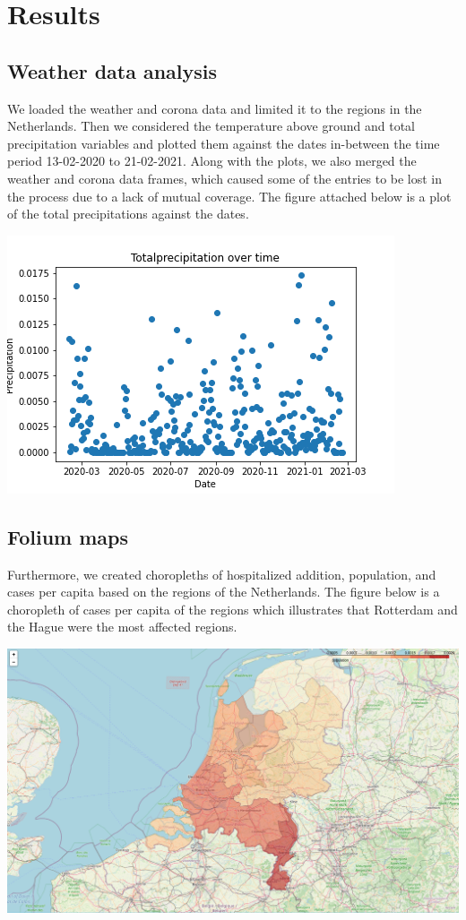 \section{Results}

\subsection{Weather data analysis}
We loaded the weather and corona data and limited it to the regions in the Netherlands. Then we considered the temperature above ground and total precipitation variables and plotted them against the dates in-between the time period 13-02-2020 to 21-02-2021. Along with the plots, we also merged the weather and corona data frames, which caused some of the entries to be lost in the process due to a lack of mutual coverage. The figure attached below is a plot of the total precipitations against the dates.

\includegraphics[width=.7\textwidth]{Figures/precipitation.png}


\subsection{Folium maps}
Furthermore, we created choropleths of hospitalized addition, population, and cases per capita based on the regions of the Netherlands. The figure below is a choropleth of cases per capita of the regions which illustrates that Rotterdam and the Hague were the most affected regions.


\includegraphics[width=.7\textwidth]{Figures/map.png}


